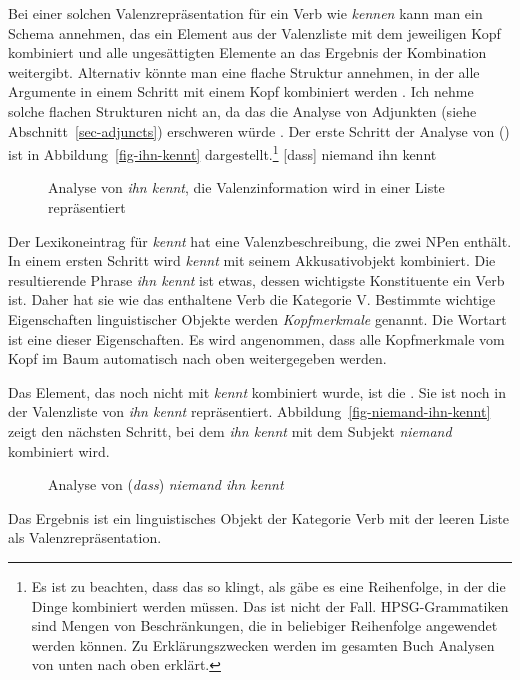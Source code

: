 Bei einer solchen Valenzrepräsentation für ein Verb wie \emph{kennen} kann man ein Schema annehmen,
das ein Element aus der Valenzliste mit dem jeweiligen Kopf kombiniert und alle ungesättigten
Elemente an das Ergebnis der Kombination weitergibt. Alternativ könnte man eine flache Struktur annehmen, in
der alle Argumente in einem Schritt mit einem Kopf kombiniert werden \parencites[34]{GSag2000a-u}[Abschnitt~3]{MuellerOrder}. Ich nehme solche flachen Strukturen nicht an, da
das die Analyse von Adjunkten (siehe Abschnitt~\ref{sec-adjuncts}) erschweren würde \citep[377--378]{MuellerOrder}.
Der erste Schritt der Analyse von () ist
in Abbildung~\vref{fig-ihn-kennt} dargestellt.\footnote{%
  Es ist zu beachten, dass das so klingt, als gäbe es eine Reihenfolge, in der die Dinge kombiniert werden müssen. Das ist nicht
  der Fall. HPSG-Grammatiken sind Mengen von Beschränkungen, die in beliebiger Reihenfolge
  angewendet werden können. Zu Erklärungszwecken werden im gesamten Buch Analysen von unten nach oben erklärt.%
}
\ea
\label{ex-dass-niemand-ihn-kennt}
{}[dass] niemand ihn kennt
\z
\begin{figure}
\centerfit{%
\begin{forest}
sm edges
[{V \sliste{ NP[\type{nom}] } }
  [{NP[\type{acc}]} [ihn] ]
  [{V \sliste{ NP[\type{nom}], NP[\type{acc}] }} [kennt]] ] ]
\end{forest}}
\caption{\label{fig-ihn-kennt}Analyse von \emph{ihn kennt}, die Valenzinformation wird in einer Liste repräsentiert}
\end{figure}
Der Lexikoneintrag für \emph{kennt} hat eine Valenzbeschreibung, die zwei NPen enthält. In einem ersten
Schritt wird \emph{kennt} mit seinem Akkusativobjekt kombiniert. Die resultierende Phrase \emph{ihn kennt}
ist etwas, dessen wichtigste Konstituente ein Verb ist. Daher hat sie wie das
enthaltene Verb die Kategorie V. Bestimmte wichtige Eigenschaften linguistischer Objekte werden \emph{Kopfmerkmale} genannt. Die Wortart
ist eine dieser Eigenschaften. Es wird angenommen, dass alle Kopfmerkmale vom Kopf im Baum
automatisch nach oben weitergegeben werden.

Das Element, das noch nicht mit \emph{kennt} kombiniert wurde, ist die \npnom. Sie ist noch
in der Valenzliste von \emph{ihn kennt} repräsentiert. Abbildung~\vref{fig-niemand-ihn-kennt}
zeigt den nächsten Schritt, bei dem \emph{ihn kennt} mit dem Subjekt \emph{niemand} kombiniert wird.
\begin{figure}
\caption{\label{fig-niemand-ihn-kennt}Analyse von (\emph{dass}) \emph{niemand ihn kennt}}
\end{figure}
Das Ergebnis ist ein linguistisches Objekt der Kategorie Verb mit der leeren Liste als Valenzrepräsentation.

